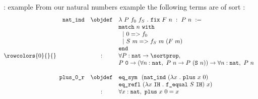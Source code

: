 \begin{frame}{\pcic: example}
From our natural numbers example the following terms are of sort \sortprop:
$$
	\rowcolors{0}{}{}
	\begin{array}{rcl}
		\texttt{nat\_ind} & \objdef & \lambda~P~f_0~f_S ~.~ \texttt{fix}~F~n ~:~ P~n ~:= \\
			&   &  \texttt{match}~ n ~\texttt{with} \\
			&   &  ~~| ~0 => f_0 \\
			&	&  ~~| ~S~m => f_S~m~(F~m) \\
			&	&  \texttt{end} \\
			& : &  \forall P : \texttt{nat} \rightarrow \sortprop,\\
			&   & P~\texttt{0} \rightarrow (\forall n : \texttt{nat},~ P~n \rightarrow P~(\texttt{S}~n)) \rightarrow \forall n : \texttt{nat},~ P~n \\
		\\
		\texttt{plus\_0\_r} & \objdef & \texttt{eq\_sym}
							~~(\texttt{nat\_ind}~(\lambda x~.~\texttt{plus}~x~0)\\
							& & \texttt{eq\_refl}~(\lambda x~\texttt{IH}~.~\texttt{f\_equal}~S~\texttt{IH})~x) \\
							& : & \forall x : \texttt{nat},~ \texttt{plus}~x~0 = x \\
	\end{array}
$$
\end{frame}

